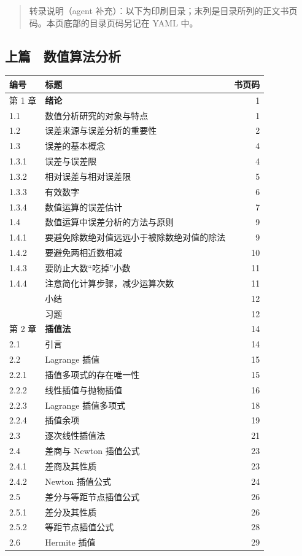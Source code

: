 \begin{quote}
转录说明（agent 补充）：以下为印刷目录；末列是目录所列的正文书页码。本页底部的目录页码另记在 YAML 中。
\end{quote}

\subsection{上篇　数值算法分析}\label{front-ux4e0aux7bc7-ux6570ux503cux7b97ux6cd5ux5206ux6790}

{\def\LTcaptype{none} %
\begin{longtable}[]{@{}llr@{}}
\toprule\noalign{}
编号 & 标题 & 书页码 \\
\midrule\noalign{}
\endhead
\bottomrule\noalign{}
\endlastfoot
第 1 章 & \textbf{绪论} & 1 \\
1.1 & 数值分析研究的对象与特点 & 1 \\
1.2 & 误差来源与误差分析的重要性 & 2 \\
1.3 & 误差的基本概念 & 4 \\
1.3.1 & 误差与误差限 & 4 \\
1.3.2 & 相对误差与相对误差限 & 5 \\
1.3.3 & 有效数字 & 6 \\
1.3.4 & 数值运算的误差估计 & 7 \\
1.4 & 数值运算中误差分析的方法与原则 & 9 \\
1.4.1 & 要避免除数绝对值远远小于被除数绝对值的除法 & 9 \\
1.4.2 & 要避免两相近数相减 & 10 \\
1.4.3 & 要防止大数``吃掉''小数 & 11 \\
1.4.4 & 注意简化计算步骤，减少运算次数 & 11 \\
& 小结 & 12 \\
& 习题 & 12 \\
第 2 章 & \textbf{插值法} & 14 \\
2.1 & 引言 & 14 \\
2.2 & Lagrange 插值 & 15 \\
2.2.1 & 插值多项式的存在唯一性 & 15 \\
2.2.2 & 线性插值与抛物插值 & 16 \\
2.2.3 & Lagrange 插值多项式 & 18 \\
2.2.4 & 插值余项 & 19 \\
2.3 & 逐次线性插值法 & 21 \\
2.4 & 差商与 Newton 插值公式 & 23 \\
2.4.1 & 差商及其性质 & 23 \\
2.4.2 & Newton 插值公式 & 24 \\
2.5 & 差分与等距节点插值公式 & 26 \\
2.5.1 & 差分及其性质 & 26 \\
2.5.2 & 等距节点插值公式 & 28 \\
2.6 & Hermite 插值 & 29 \\
\end{longtable}
}

